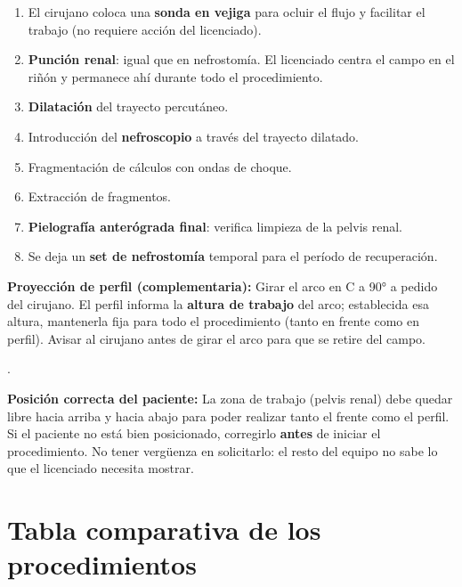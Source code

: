 {\begin{enumerate}[noitemsep]
  \item El cirujano coloca una \textbf{sonda en vejiga} para ocluir el flujo y facilitar el trabajo (no requiere acción del licenciado).
  \item \textbf{Punción renal}: igual que en nefrostomía. El licenciado centra el campo en el riñón y permanece ahí durante todo el procedimiento.
  \item \textbf{Dilatación} del trayecto percutáneo.
  \item Introducción del \textbf{nefroscopio} a través del trayecto dilatado.
  \item Fragmentación de cálculos con ondas de choque.
  \item Extracción de fragmentos.
  \item \textbf{Pielografía anterógrada final}: verifica limpieza de la pelvis renal.
  \item Se deja un \textbf{set de nefrostomía} temporal para el período de recuperación.
\end{enumerate}

\clearpage

\begin{cajakeypoints}
\textbf{Proyección de perfil (complementaria):} Girar el arco en C a 90° a pedido del cirujano. El perfil informa la \textbf{altura de trabajo} del arco; establecida esa altura, mantenerla fija para todo el procedimiento (tanto en frente como en perfil). Avisar al cirujano antes de girar el arco para que se retire del campo.
\end{cajakeypoints}

.\\


\begin{cajariesgo}
\textbf{Posición correcta del paciente:} La zona de trabajo (pelvis renal) debe quedar libre hacia arriba y hacia abajo para poder realizar tanto el frente como el perfil. Si el paciente no está bien posicionado, corregirlo \textbf{antes} de iniciar el procedimiento. No tener vergüenza en solicitarlo: el resto del equipo no sabe lo que el licenciado necesita mostrar.
\end{cajariesgo}

\section*{Tabla comparativa de los procedimientos}

}
